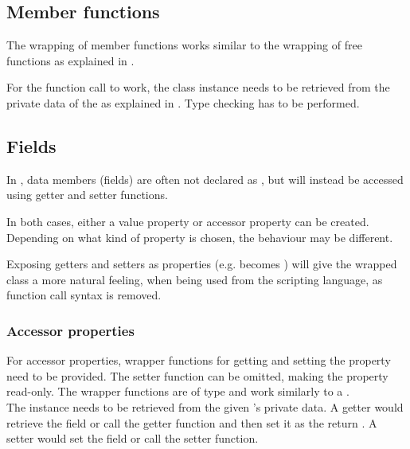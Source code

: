 \subsection{Member functions}

The wrapping of member functions works similar to the wrapping of free functions as explained in .

For the function call to work, the class instance needs to be retrieved from the private data of the   as explained in . Type checking has to be performed.

\subsection{Fields}
\label{sec:Fields}

In , data members (fields) are often not declared as , but will instead be accessed using getter and setter functions.

In both cases, either a  value property or accessor property can be created. Depending on what kind of property is chosen, the behaviour may be different.

Exposing getters and setters as properties (e.g.  becomes ) will give the wrapped class a more natural feeling, when being used from the scripting language, as function call syntax is removed.

\subsubsection{Accessor properties}

For accessor properties, wrapper functions for getting and setting the property need to be provided. The setter function can be omitted, making the property read-only. The wrapper functions are of type  and work similarly to a .\\
The  instance needs to be retrieved from the given 's private data. A getter would retrieve the field or call the  getter function and then set it as the return . A setter would set the field or call the  setter function.

